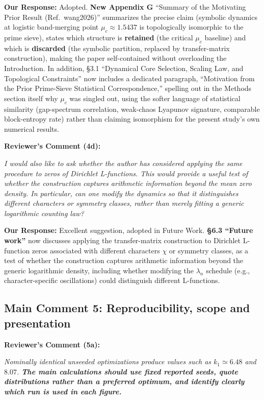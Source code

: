 \documentclass[11pt]{article}
\begin{document}
\noindent\textbf{Our Response:} Adopted. \textbf{New Appendix G} ``Summary of the Motivating Prior Result (Ref.~wang2026)'' summarizes the precise claim (symbolic dynamics at logistic band-merging point $\mu_c\approx1.5437$ is topologically isomorphic to the prime sieve), states which structure is \textbf{retained} (the critical $\mu_c$ baseline) and which is \textbf{discarded} (the symbolic partition, replaced by transfer-matrix construction), making the paper self-contained without overloading the Introduction. In addition, \S3.1 ``Dynamical Core Selection, Scaling Law, and Topological Constraints'' now includes a dedicated paragraph, ``Motivation from the Prior Prime-Sieve Statistical Correspondence,'' spelling out in the Methods section itself why $\mu_c$ was singled out, using the softer language of statistical similarity (gap-spectrum correlation, weak-chaos Lyapunov signature, comparable block-entropy rate) rather than claiming isomorphism for the present study's own numerical results.

\vspace{0.3cm}
\noindent\textbf{Reviewer's Comment (4d):}
\begin{quotebox}
\itshape I would also like to ask whether the author has considered applying the same procedure to zeros of Dirichlet L-functions. This would provide a useful test of whether the construction captures arithmetic information beyond the mean zero density. In particular, can one modify the dynamics so that it distinguishes different characters or symmetry classes, rather than merely fitting a generic logarithmic counting law?
\end{quotebox}

\noindent\textbf{Our Response:} Excellent suggestion, adopted in Future Work. \textbf{\S6.3 ``Future work''} now discusses applying the transfer-matrix construction to Dirichlet L-function zeros associated with different characters $\chi$ or symmetry classes, as a test of whether the construction captures arithmetic information beyond the generic logarithmic density, including whether modifying the $\lambda_n$ schedule (e.g., character-specific oscillations) could distinguish different L-functions.

\subsection*{Main Comment 5: Reproducibility, scope and presentation}

\noindent\textbf{Reviewer's Comment (5a):}
\begin{quotebox}
\itshape Nominally identical unseeded optimizations produce values such as $k_1 \simeq 6.48$ and $8.07$. \textbf{The main calculations should use fixed reported seeds, quote distributions rather than a preferred optimum, and identify clearly which run is used in each figure.}
\end{quotebox}
\end{document}
